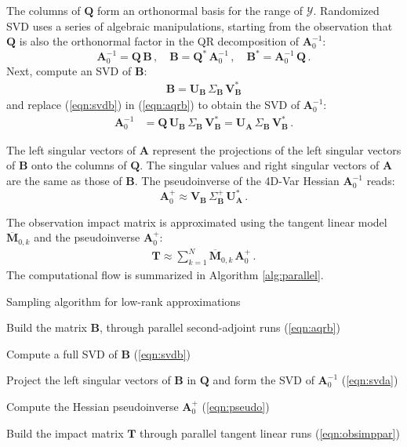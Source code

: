 \documentclass[final,sort&compress]{elsarticle}
\newcommand{\Vm}{\mathbf{V}}
\newcommand{\Um}{\mathbf{U}}
\newcommand{\T}{\mathbf{T}}
\newcommand{\M}{\mathbf{M}}
\newcommand{\A}{\mathbf{A}}
\newcommand{\B}{\mathbf{B}}
\newcommand{\Q}{\mathbf{Q}}
\newcommand{\V}{ \mathbf{V} }
\newcommand{\Y}{\mathcal{Y}}
\begin{document}
The columns of $\Q$ form an orthonormal basis for the range of $\Y$.
Randomized SVD uses a series of algebraic manipulations, starting from the observation that $\Q$ is also the
orthonormal factor in the QR decomposition of $\A_0^{-1}$:
\begin{equation}
\label{eqn:aqrb}
\A_0^{-1} =  \Q \, \B \,, \quad
\B = \Q^* \, \A_0^{-1}  \,, \quad
\B^* = \A_0^{-1} \, \Q\,.
\end{equation}
Next, compute an SVD of $\B$:
\begin{eqnarray}
\B = \Um_{\B} \, \Sigma_{\B} \, \V_{\B}^* \label{eqn:svdb}
\end{eqnarray}
and replace (\ref{eqn:svdb}) in (\ref{eqn:aqrb}) to obtain the SVD of $\A_0^{-1}$:
\begin{eqnarray}
\A_0^{-1} &= \Q \, \Um_{\B} \, \Sigma_{\B} \, \V_{\B}^* = \Um_{\A} \, \Sigma_{\B} \, \V_{\B}^*\,. \label{eqn:svda}
\end{eqnarray}

The left singular vectors of $\A$ represent the projections of the left singular vectors of $\B$ onto the columns of $\Q$. 
The singular values and right singular vectors of $\A$ are the same as those of $\B$. 
The pseudoinverse of the 4D-Var Hessian $\A_0^{-1}$ reads:
\begin{equation}
\A_0^+ \approx 
\Vm_{\B} \, \Sigma_{\B}^+ \, \Um_{\A}^* \,.
\label{eqn:pseudo}
\end{equation}

The observation impact matrix is approximated using the tangent linear model $\overline{\M}_{0,k}$ and the pseudoinverse $\A_0^+$:
\begin{eqnarray}
 \T \approx \sum_{k=1}^N \overline{\M}_{0,k} \, \A_0^+\,. \label{eqn:obsimppar}
\end{eqnarray}
The computational flow is summarized in Algorithm \ref{alg:parallel}.

\begin{algorithm}[h]
\caption{Sampling algorithm for low-rank approximations\label{alg:parallel}}
\begin{algorithmic}[1]
\item Build the matrix $\B$, through parallel second-adjoint runs (\ref{eqn:aqrb})
\item Compute a full SVD of $\B$  (\ref{eqn:svdb})
\item Project the left singular vectors of $\B$ in $\Q$ and form the SVD of $\A_0^{-1}$  (\ref{eqn:svda})
\item Compute the Hessian pseudoinverse $\A_0^+$ (\ref{eqn:pseudo})
\item Build the impact matrix $\T$ through parallel tangent linear runs (\ref{eqn:obsimppar})
\end{algorithmic}
\end{algorithm}
\end{document}
